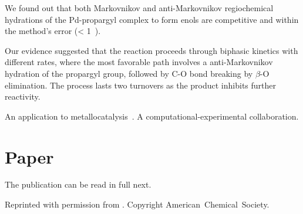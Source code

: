 We found out that both Markovnikov and anti-Markovnikov regiochemical
hydrations of the Pd-propargyl complex to form enols are competitive and within
the method's error (< 1~\kcalmol).

Our evidence suggested that the reaction proceeds through biphasic kinetics
with different rates, where the most favorable path involves a 
anti-Markovnikov hydration of the propargyl group, followed by C-O bond breaking
by $\beta$-O elimination.
The process lasts two turnovers as the product inhibits further
reactivity.

An application to metallocatalysis~\cite{Coelho_2019}.
A computational-experimental collaboration.


\section{Paper}

The publication can be read in full next.

Reprinted with permission from
.
Copyright
\citeyear{Coelho_2019}
American~Chemical~Society.



